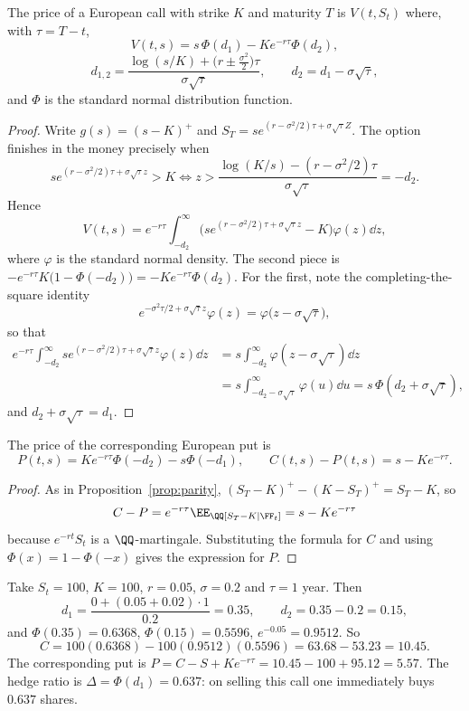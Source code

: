 \begin{theorem}\label{thm:bs-formula}
	The price of a European call with strike $K$ and maturity $T$ is $V(t,S_t)$ where, with $\tau = T-t$,
	$$
	V(t,s) = s\,\Phi(d_1) - Ke^{-r\tau}\Phi(d_2),
	$$
	$$
	d_{1,2} = \frac{\log(s/K) + \big(r\pm\tfrac{\sigma^2}{2}\big)\tau}{\sigma\sqrt\tau}, \qquad d_2 = d_1 - \sigma\sqrt\tau,
	$$
	and $\Phi$ is the standard normal distribution function.
\end{theorem}

\begin{proof}
	Write $g(s) = (s-K)^+$ and $S_T = se^{(r-\sigma^2/2)\tau + \sigma\sqrt\tau Z}$. The option finishes in the money precisely when
	$$
	se^{(r-\sigma^2/2)\tau + \sigma\sqrt\tau z} > K \iff z > \frac{\log(K/s) - (r-\sigma^2/2)\tau}{\sigma\sqrt\tau} = -d_2.
	$$
	Hence
	$$
	V(t,s) = e^{-r\tau}\int_{-d_2}^\infty\Big(se^{(r-\sigma^2/2)\tau + \sigma\sqrt\tau z} - K\Big)\varphi(z)\dd z,
	$$
	where $\varphi$ is the standard normal density. The second piece is $-e^{-r\tau}K\big(1-\Phi(-d_2)\big) = -Ke^{-r\tau}\Phi(d_2)$. For the first, note the completing-the-square identity
	$$
	e^{-\sigma^2\tau/2 + \sigma\sqrt\tau z}\varphi(z) = \varphi\big(z - \sigma\sqrt\tau\big),
	$$
	so that
	\begin{align*}
		e^{-r\tau}\int_{-d_2}^\infty se^{(r-\sigma^2/2)\tau+\sigma\sqrt\tau z}\varphi(z)\dd z &= s\int_{-d_2}^\infty \varphi(z-\sigma\sqrt\tau)\dd z\\
		&= s\int_{-d_2-\sigma\sqrt\tau}^\infty\varphi(u)\dd u = s\,\Phi(d_2+\sigma\sqrt\tau),
	\end{align*}
	and $d_2 + \sigma\sqrt\tau = d_1$.
\end{proof}

\begin{corollary}
	The price of the corresponding European put is
	$$
	P(t,s) = Ke^{-r\tau}\Phi(-d_2) - s\Phi(-d_1), \qquad C(t,s) - P(t,s) = s - Ke^{-r\tau}.
	$$
\end{corollary}

\begin{proof}
	As in Proposition~\ref{prop:parity}, $(S_T-K)^+ - (K-S_T)^+ = S_T-K$, so
	$$
	C - P = e^{-r\tau}\EE_\QQ[S_T - K\mid\FF_t] = s - Ke^{-r\tau}
	$$
	because $e^{-rt}S_t$ is a $\QQ$-martingale. Substituting the formula for $C$ and using $\Phi(x) = 1-\Phi(-x)$ gives the expression for $P$.
\end{proof}

\begin{example}\label{ex:bs-numeric}
	Take $S_t = 100$, $K = 100$, $r = 0.05$, $\sigma = 0.2$ and $\tau = 1$ year. Then
	$$
	d_1 = \frac{0 + (0.05+0.02)\cdot1}{0.2} = 0.35, \qquad d_2 = 0.35 - 0.2 = 0.15,
	$$
	and $\Phi(0.35) = 0.6368$, $\Phi(0.15) = 0.5596$, $e^{-0.05} = 0.9512$. So
	$$
	C = 100(0.6368) - 100(0.9512)(0.5596) = 63.68 - 53.23 = 10.45.
	$$
	The corresponding put is $P = C - S + Ke^{-r\tau} = 10.45 - 100 + 95.12 = 5.57$. The hedge ratio is $\Delta = \Phi(d_1) = 0.637$: on selling this call one immediately buys $0.637$ shares.
\end{example}

